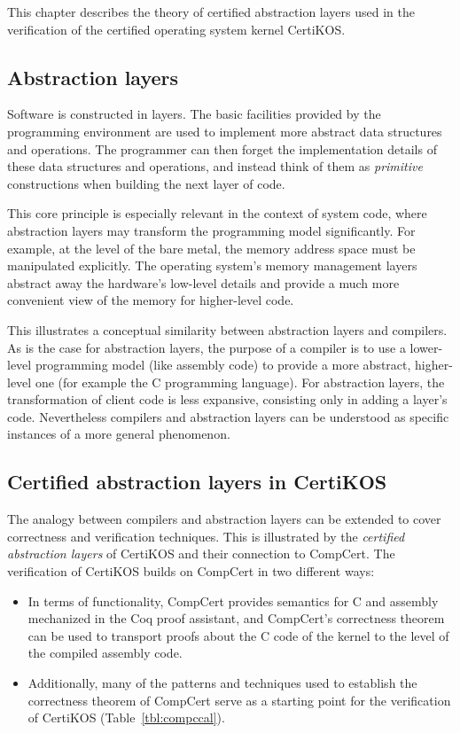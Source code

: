\documentclass[11pt,oneside,draft]{book}
\theoremstyle{definition}
\begin{document}
This chapter describes
the theory of certified abstraction layers
used in the verification of
the certified operating system kernel CertiKOS.

\subsection{Abstraction layers} %

Software is constructed in layers.
The basic facilities provided by the programming environment
are used to implement more abstract data structures and operations.
The programmer can then forget the implementation details
of these data structures and operations,
and instead think of them as \emph{primitive} constructions
when building the next layer of code.

This core principle is especially relevant
in the context of system code,
where abstraction layers
may transform the programming model significantly.
For example,
at the level of the bare metal,
the memory address space must be manipulated explicitly.
The operating system's memory management layers
abstract away the hardware's low-level details and
provide a much more convenient view of the memory
for higher-level code.

This illustrates a conceptual similarity between
abstraction layers and compilers.
As is the case for abstraction layers,
the purpose of a compiler is to use a lower-level programming model
(like assembly code)
to provide a more abstract, higher-level one
(for example the C programming language).
For abstraction layers,
the transformation of client code
is less expansive,
consisting only in adding a layer's code.
Nevertheless compilers and abstraction layers
can be understood as specific instances
of a more general phenomenon.


\subsection{Certified abstraction layers in CertiKOS} %

The analogy between compilers and abstraction layers
can be extended to cover correctness and verification techniques.
This is illustrated by the \emph{certified abstraction layers}
of CertiKOS and their connection to CompCert.
The verification of CertiKOS builds on CompCert
in two different ways:
\begin{itemize}
\item
  In terms of functionality,
  CompCert provides semantics for C and assembly
  mechanized in the Coq proof assistant,
  and CompCert's correctness theorem
  can be used to transport proofs about the C code of the kernel
  to the level of the compiled assembly code.
\item
  Additionally,
  many of the patterns and techniques used
  to establish the correctness theorem of CompCert
  serve as a starting point for
  the verification of CertiKOS
  (Table~\ref{tbl:compccal}).
\end{itemize}
\end{document}
